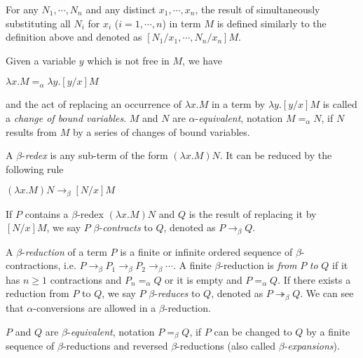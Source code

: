 For any $ N_1, \cdots , N_n $ and any distinct $ x_1, \cdots , x_n $, the result of simultaneously substituting all $ N_i $ for $ x_i $ ($ i = 1, \cdots , n $) in term $ M $ is defined similarly to the definition above and denoted as $ [N_1/x_1, \cdots , N_n/x_n]M $.
\mbox\\
\begin{definition}
\label{definition:alpha}
Given a variable $ y $ which is not free in $ M $, we have
\begin{center}
$ \lambda x.M =_\alpha \lambda y.[y/x]M $
\end{center}
and the act of replacing an occurrence of $ \lambda x.M $ in a term by $ \lambda y.[y/x]M $ is called a \emph{change of bound variables}. $ M $ and $ N $ are $ \alpha $-\emph{equivalent}, notation $ M =_\alpha N $, if $ N $ results from $ M $ by a series of changes of bound variables.
\end{definition}
\mbox\\
\begin{definition}
\label{definition:beta}
\mbox\\
\begin{myitemize}
\item A $ \beta $-\emph{redex} is any sub-term of the form $ (\lambda x.M)N $. It can be reduced by the following rule
\begin{center}
$ (\lambda x.M)N  \to _\beta [N/x]M $
\end{center}
If $ P $ contains a $ \beta $-redex $ (\lambda x.M)N $ and $ Q $ is the result of replacing it by $ [N/x]M $, we say $ P $ $ \beta $-\emph{contracts} to $ Q $, denoted as $ P \to _\beta Q $.
\item A $ \beta $-\emph{reduction} of a term $ P $ is a finite or infinite ordered sequence of $ \beta $-contractions, i.e. $ P \to _\beta P_1 \to _\beta P_2 \to _\beta \cdots $. A finite $ \beta $-reduction is \emph{from} $ P $ \emph{to} $ Q $ if it has $ n \geq 1 $ contractions and $ P_n = _\alpha Q $ or it is empty and $ P = _\alpha Q $. If there exists a reduction from $ P $ to $ Q $, we say $ P $ $ \beta $-\emph{reduces} to $ Q $, denoted as $ P \twoheadrightarrow _\beta Q $. We can see that $ \alpha $-conversions are allowed in a $ \beta $-reduction.
\item $ P $ and $ Q $ are $ \beta $-\emph{equivalent}, notation $ P =_\beta Q $, if $ P $ can be changed to $ Q $ by a finite sequence of $ \beta $-reductions and reversed $ \beta $-reductions (also called $ \beta $-\emph{expansions}).
\end{myitemize}
\end{definition}

